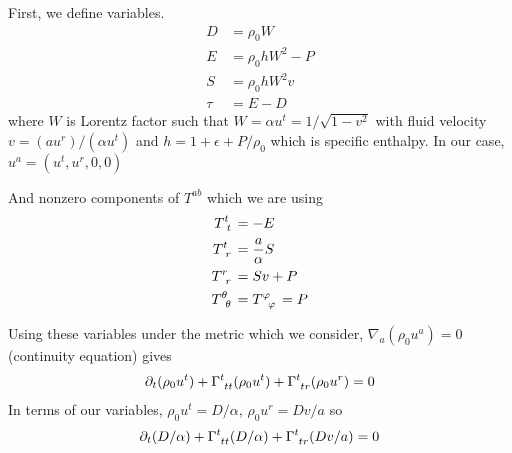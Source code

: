 \documentclass[prd]{revtex4}
\begin{document}
First, we define variables. 
\begin{align}
D &= \rho_0 W  \\
E &= \rho_0 h  W^2 -P \\
S &= \rho_0 h W^2 v\\
\tau &= E-D
\end{align}
where $W$ is Lorentz factor such that $W = \alpha u^t=1/\sqrt{1-v^2}$ with fluid velocity $v =(a u^r) / (\alpha u^t)$ and $h=1+\epsilon+P/\rho_0$ which is specific enthalpy. In our case, $u^a = (u^t, u^r, 0, 0)$

And nonzero components of $T^{ab}$ which we are using
\begin{align}
T\indices{^t_t} &= -E \\
T\indices{^t_r} &= \frac{a}{\alpha} S \\
T\indices{^r_r} &=Sv+P\\
T\indices{^\theta_\theta}&=T\indices{^\varphi_\varphi}=P
\end{align}

Using these variables under the metric which we consider, $\nabla_a (\rho_0 u^a)=0$ (continuity equation) gives
\begin{align}
\partial_t (\rho_0 u^t) + \Gamma\indices{^t_{tt}}(\rho_0 u^t) + \Gamma\indices{^t_{tr}}(\rho_0 u^r) = 0
\end{align} 
In terms of our variables, $\rho_0 u^t = D/\alpha$, $\rho_0 u^r = D v /a$ so
\begin{align}
\partial_t (D/\alpha) + \Gamma\indices{^t_{tt}}(D/\alpha) + \Gamma\indices{^t_{tr}}(D v / a) = 0
\end{align} 
\end{document}
